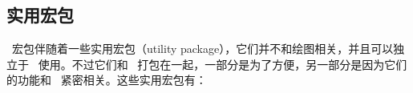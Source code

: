 \subsection{实用宏包}

\begin{onehalfspacing}

\pgfname\ 宏包伴随着一些实用宏包（utility package），它们并不和绘图相关，并且可以独立于 \pgfname\ 使用。不过它们和 \pgfname\ 打包在一起，一部分是为了方便，另一部分是因为它们的功能和 \pgfname\ 紧密相关。这些实用宏包有：


\end{onehalfspacing}
